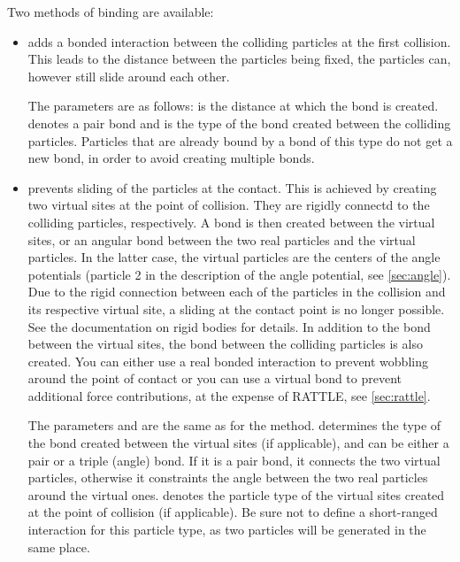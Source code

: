Two methods of binding are available:
\begin{itemize}
\item {} adds a bonded interaction between the
  colliding particles at the first collision. This leads to the
  distance between the particles being fixed, the particles can,
  however still slide around each other.

  The parameters are as follows:  is the distance at which the
  bond is created.  denotes a pair bond and is the type of
  the bond created between the colliding particles. Particles that are
  already bound by a bond of this type do not get a new bond, in order
  to avoid creating multiple bonds.

\item {} prevents sliding of the
  particles at the contact. This is achieved by creating two virtual
  sites at the point of collision. They are rigidly connectd to the
  colliding particles, respectively. A bond is then created between
  the virtual sites, or an angular bond between the two real particles
  and the virtual particles. In the latter case, the virtual particles
  are the centers of the angle potentials (particle 2 in the
  description of the angle potential, see \ref{sec:angle}). Due to the
  rigid connection between each of the particles in the collision and
  its respective virtual site, a sliding at the contact point is no
  longer possible.  See the documentation on rigid bodies for
  details. In addition to the bond between the virtual sites, the bond
  between the colliding particles is also created. You can either use
  a real bonded interaction to prevent wobbling around the point of
  contact or you can use a virtual bond to prevent additional force
  contributions, at the expense of RATTLE, see \ref{sec:rattle}.

  The parameters  and  are the same as for the
   method.  determines the type of the
  bond created between the virtual sites (if applicable), and can be
  either a pair or a triple (angle) bond. If it is a pair bond, it
  connects the two virtual particles, otherwise it constraints the
  angle between the two real particles around the virtual
  ones.  denotes the particle type of the virtual sites
  created at the point of collision (if applicable). Be sure not to
  define a short-ranged interaction for this particle type, as two
  particles will be generated in the same place.
\end{itemize}

